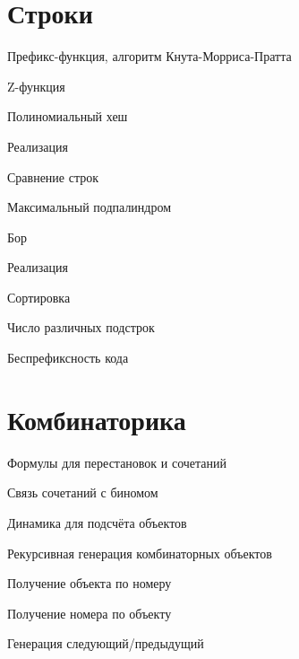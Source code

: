 \documentclass[a4paper,12pt]{article}
\begin{document}
\begin{multicols}{2}
  \section{Строки}
    \begin{compactenum}
      \item Префикс-функция, алгоритм Кнута-Морриса-Пратта
      \item Z-функция
      \item Полиномиальный хеш
        \begin{compactenum}
          \item Реализация
          \item Сравнение строк
          \item Максимальный подпалиндром
        \end{compactenum}
      \item Бор
        \begin{compactenum}
          \item Реализация
          \item Сортировка
          \item Число различных подстрок
          \item Беспрефиксность кода
        \end{compactenum}
    \end{compactenum}

  \section{Комбинаторика}
    \begin{compactenum}
      \item Формулы для перестановок и сочетаний
      \item Связь сочетаний с биномом
      \item Динамика для подсчёта объектов
      \item Рекурсивная генерация комбинаторных объектов 
      \item Получение объекта по номеру 
      \item Получение номера по объекту 
      \item Генерация следующий/предыдущий
    \end{compactenum}
\end{multicols}
\end{document}
